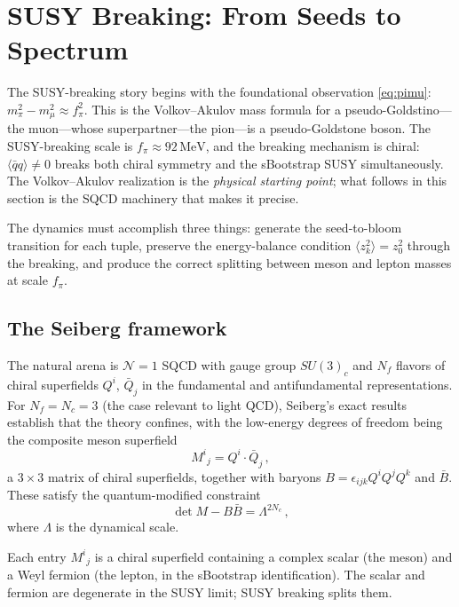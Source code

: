 \documentclass[12pt,a4paper]{article}
\newcommand{\MeV}{\,\text{MeV}}
\newcommand{\qqbar}{\langle\bar{q}q\rangle}
\begin{document}
\section{SUSY Breaking: From Seeds to Spectrum}
\label{sec:breaking}

The SUSY-breaking story begins with the foundational observation 
\eqref{eq:pimu}: $m_\pi^2 - m_\mu^2 \approx f_\pi^2$. This is the 
Volkov--Akulov mass formula for a pseudo-Goldstino---the muon---whose 
superpartner---the pion---is a pseudo-Goldstone boson. The SUSY-breaking 
scale is $f_\pi \approx 92\MeV$, and the breaking mechanism is chiral: 
$\qqbar \neq 0$ breaks both chiral symmetry and the sBootstrap SUSY 
simultaneously. The Volkov--Akulov realization is the \emph{physical 
starting point}; what follows in this section is the SQCD machinery 
that makes it precise.

The dynamics must accomplish three things: generate the seed-to-bloom 
transition for each tuple, preserve the energy-balance condition 
$\langle z_k^2\rangle = z_0^2$ through the breaking, and produce 
the correct splitting between meson and lepton masses at scale $f_\pi$.

\subsection{The Seiberg framework}

The natural arena is $\mathcal{N}=1$ SQCD with gauge group $SU(3)_c$ 
and $N_f$ flavors of chiral superfields $Q^i$, $\bar{Q}_j$ in the 
fundamental and antifundamental representations. For $N_f = N_c = 3$ 
(the case relevant to light QCD), Seiberg's exact results 
\cite{Seiberg1995} establish that the theory confines, with the 
low-energy degrees of freedom being the composite meson superfield
\begin{equation}
M^i{}_j = Q^i \cdot \bar{Q}_j\,,
\end{equation}
a $3\times 3$ matrix of chiral superfields, together with baryons 
$B = \epsilon_{ijk}Q^iQ^jQ^k$ and $\bar{B}$. These satisfy the 
quantum-modified constraint
\begin{equation}
\label{eq:seiberg}
\det M - B\bar{B} = \Lambda^{2N_c}\,,
\end{equation}
where $\Lambda$ is the dynamical scale.

Each entry $M^i{}_j$ is a chiral superfield containing a complex 
scalar (the meson) and a Weyl fermion (the lepton, in the sBootstrap 
identification). The scalar and fermion are degenerate in the SUSY 
limit; SUSY breaking splits them.
\end{document}
